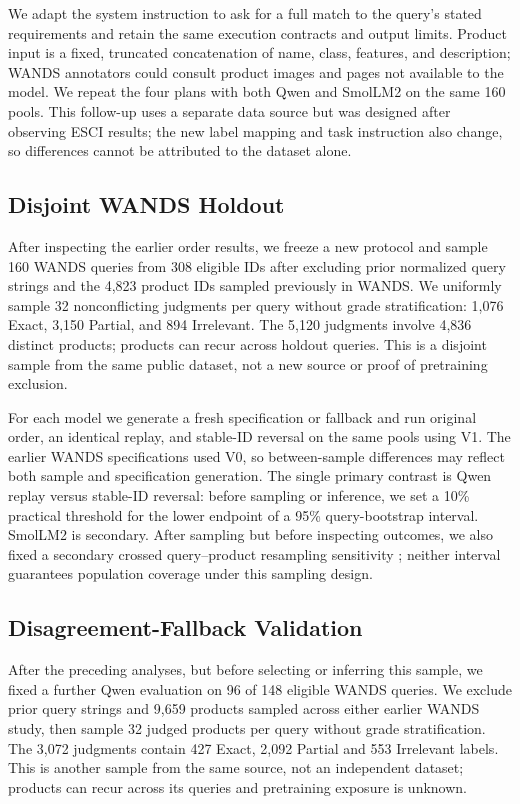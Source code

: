 \documentclass[conference]{IEEEtran}
\begin{document}
We adapt the system instruction to ask for a full match to the query's stated requirements and retain the same execution contracts and output limits. Product input is a fixed, truncated concatenation of name, class, features, and description; WANDS annotators could consult product images and pages not available to the model. We repeat the four plans with both Qwen and SmolLM2 on the same 160 pools. This follow-up uses a separate data source but was designed after observing ESCI results; the new label mapping and task instruction also change, so differences cannot be attributed to the dataset alone.

\subsection{Disjoint WANDS Holdout}
After inspecting the earlier order results, we freeze a new protocol and sample 160 WANDS queries from 308 eligible IDs after excluding prior normalized query strings and the 4,823 product IDs sampled previously in WANDS. We uniformly sample 32 nonconflicting judgments per query without grade stratification: 1,076 Exact, 3,150 Partial, and 894 Irrelevant. The 5,120 judgments involve 4,836 distinct products; products can recur across holdout queries. This is a disjoint sample from the same public dataset, not a new source or proof of pretraining exclusion.

For each model we generate a fresh specification or fallback and run original order, an identical replay, and stable-ID reversal on the same pools using V1. The earlier WANDS specifications used V0, so between-sample differences may reflect both sample and specification generation. The single primary contrast is Qwen replay versus stable-ID reversal: before sampling or inference, we set a 10\% practical threshold for the lower endpoint of a 95\% query-bootstrap interval. SmolLM2 is secondary. After sampling but before inspecting outcomes, we also fixed a secondary crossed query--product resampling sensitivity \cite{pigeonhole}; neither interval guarantees population coverage under this sampling design.

\subsection{Disagreement-Fallback Validation}
After the preceding analyses, but before selecting or inferring this sample, we fixed a further Qwen evaluation on 96 of 148 eligible WANDS queries. We exclude prior query strings and 9,659 products sampled across either earlier WANDS study, then sample 32 judged products per query without grade stratification. The 3,072 judgments contain 427 Exact, 2,092 Partial and 553 Irrelevant labels. This is another sample from the same source, not an independent dataset; products can recur across its queries and pretraining exposure is unknown.
\end{document}
